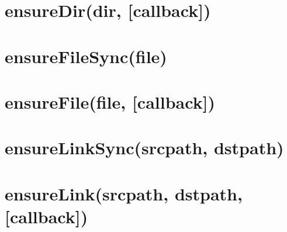 \documentclass[twoside]{book}
\newcommand{\+}{\discretionary{\mbox{\scriptsize$\hookleftarrow$}}{}{}}
\begin{document}
\chapter{ensure\+Dir(dir, \mbox{[}callback\mbox{]})}
\label{md_dsmacc_examples_DRmerge_node_modules_electron-packager_node_modules_electron-download_node_modules_fs-extra_docs_ensureDir}

\chapter{ensure\+File\+Sync(file)}
\label{md_dsmacc_examples_DRmerge_node_modules_electron-packager_node_modules_electron-download_node_mo35d80fba59d0b3625608270b8d5e173c}

\chapter{ensure\+File(file, \mbox{[}callback\mbox{]})}
\label{md_dsmacc_examples_DRmerge_node_modules_electron-packager_node_modules_electron-download_node_modules_fs-extra_docs_ensureFile}

\chapter{ensure\+Link\+Sync(srcpath, dstpath)}
\label{md_dsmacc_examples_DRmerge_node_modules_electron-packager_node_modules_electron-download_node_mo5749e4964dc20575ef230fd731f321f6}

\chapter{ensure\+Link(srcpath, dstpath, \mbox{[}callback\mbox{]})}
\label{md_dsmacc_examples_DRmerge_node_modules_electron-packager_node_modules_electron-download_node_modules_fs-extra_docs_ensureLink}

\end{document}
